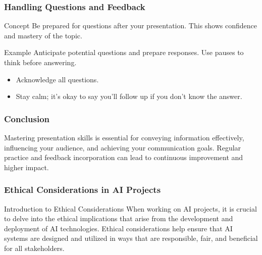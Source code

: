 \documentclass[aspectratio=169]{beamer}
\begin{document}
\begin{frame}[fragile]
    \frametitle{Handling Questions and Feedback}
    \begin{block}{Concept}
        Be prepared for questions after your presentation. This shows confidence and mastery of the topic.
    \end{block}
    \begin{block}{Example}
        Anticipate potential questions and prepare responses. Use pauses to think before answering.
    \end{block}
    \begin{itemize}
        \item Acknowledge all questions.
        \item Stay calm; it’s okay to say you’ll follow up if you don’t know the answer.
    \end{itemize}
\end{frame}

\begin{frame}[fragile]
    \frametitle{Conclusion}
    Mastering presentation skills is essential for conveying information effectively, influencing your audience, and achieving your communication goals. Regular practice and feedback incorporation can lead to continuous improvement and higher impact.
\end{frame}

\begin{frame}[fragile]
    \frametitle{Ethical Considerations in AI Projects}
    \begin{block}{Introduction to Ethical Considerations}
        When working on AI projects, it is crucial to delve into the ethical implications that arise from the development and deployment of AI technologies. Ethical considerations help ensure that AI systems are designed and utilized in ways that are responsible, fair, and beneficial for all stakeholders.
    \end{block}
\end{frame}
\end{document}
